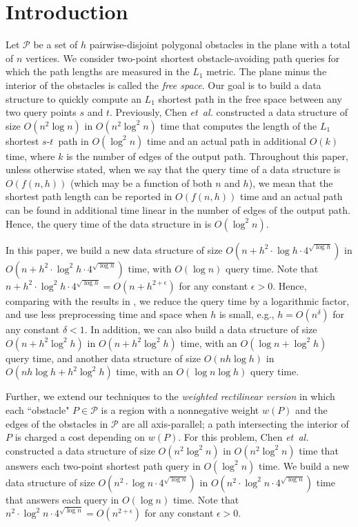 \documentclass[english,runningheads,11pt]{llncs}
\def\etal{\textsl{et~al. }}
\def\calP{\mathcal{P}}
\def\st{$s$-$t$}
\begin{document}
\section{Introduction}
\label{sec:intro}
Let $\calP$ be a set of $h$ pairwise-disjoint polygonal obstacles in the
plane with a total of $n$ vertices. We consider two-point shortest obstacle-avoiding
path queries for which the path lengths are measured in the $L_1$ metric.
The plane minus the interior of
the obstacles is called the {\em free space}. Our goal is to build a
data structure to quickly compute an $L_1$ shortest path
in the free space between any two query points $s$ and $t$.
Previously, Chen \etal \cite{ref:ChenSh00} constructed a data structure of
size $O(n^2\log n)$ in $O(n^2\log^2 n)$ time that computes the
length of the $L_1$ shortest \st\ path in $O(\log^2 n)$ time and an
actual path in additional $O(k)$ time,
where $k$ is the number of edges of the output path. Throughout this paper,
unless otherwise stated,
when we say that the query time of a data structure is $O(f(n,h))$ (which
may be a function of both $n$ and $h$), we
mean that the shortest path length can be reported in
$O(f(n,h))$ time and an actual path can be found in additional time
linear in the number of edges of the output path. Hence, the query
time of the data structure in \cite{ref:ChenSh00} is $O(\log^2 n)$.

In this paper, we build a new data structure of size
$O(n+h^2\cdot \log h \cdot 4^{\sqrt{\log h}})$ in
$O(n+h^2\cdot \log^{2} h \cdot 4^{\sqrt{\log h}})$ time, with $O(\log n)$
query time.  Note that $n+h^2\cdot \log^{2} h \cdot 4^{\sqrt{\log
h}}=O(n+h^{2+\epsilon})$ for any constant $\epsilon>0$. Hence, comparing with
the results in \cite{ref:ChenSh00}, we reduce the query
time by a logarithmic factor, and use less preprocessing time and
space when $h$ is small, e.g., $h=O(n^\delta)$ for any constant $\delta<1$.
In addition, we can also build a data structure of size $O(n+h^2\log^2h)$
in $O(n+h^2\log^2 h)$ time, with an $O(\log n+\log^2 h)$ query time,
and another data structure of size $O(nh\log h)$
in $O(nh\log h+h^2\log^2 h)$ time, with an $O(\log n\log h)$ query
time.

Further, we extend our techniques to the {\em weighted rectilinear
version} in which each ``obstacle" $P\in \calP$ is a region with a nonnegative
weight $w(P)$ and the edges of the obstacles in $\calP$ are all axis-parallel;
a path intersecting the interior of $P$ is charged a cost
depending on $w(P)$. For this problem, Chen \etal \cite{ref:ChenSh00}
constructed a data structure of
size $O(n^2\log^2 n)$ in $O(n^2\log^2 n)$ time that answers each
two-point shortest path query in $O(\log^2 n)$ time.
We build a new data structure of size $O(n^2\cdot \log n \cdot
4^{\sqrt{\log n}})$ in $O(n^2\cdot \log^{2} n \cdot 4^{\sqrt{\log
n}})$ time that answers each query in $O(\log n)$ time.
Note that $n^2\cdot \log^{2} n \cdot 4^{\sqrt{\log
n}}=O(n^{2+\epsilon})$ for any constant $\epsilon>0$.
\end{document}
